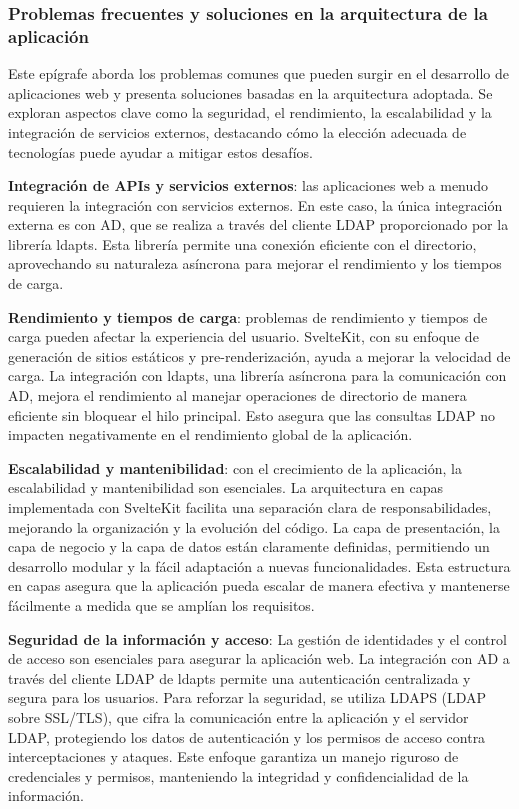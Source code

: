 \subsubsection{Problemas frecuentes y soluciones en la arquitectura de la aplicación}

Este epígrafe aborda los problemas comunes que pueden surgir en el desarrollo de aplicaciones web y presenta soluciones basadas en la arquitectura adoptada. Se exploran aspectos clave como la seguridad, el rendimiento, la escalabilidad y la integración de servicios externos, destacando cómo la elección adecuada de tecnologías puede ayudar a mitigar estos desafíos.

\textbf{Integración de APIs y servicios externos}: las aplicaciones web a menudo requieren la integración con servicios externos. En este caso, la única integración externa es con AD, que se realiza a través del cliente LDAP proporcionado por la librería ldapts. Esta librería permite una conexión eficiente con el directorio, aprovechando su naturaleza asíncrona para mejorar el rendimiento y los tiempos de carga.

\textbf{Rendimiento y tiempos de carga}: problemas de rendimiento y tiempos de carga pueden afectar la experiencia del usuario. SvelteKit, con su enfoque de generación de sitios estáticos y pre-renderización, ayuda a mejorar la velocidad de carga. La integración con ldapts, una librería asíncrona para la comunicación con AD, mejora el rendimiento al manejar operaciones de directorio de manera eficiente sin bloquear el hilo principal. Esto asegura que las consultas LDAP no impacten negativamente en el rendimiento global de la aplicación.

\textbf{Escalabilidad y mantenibilidad}: con el crecimiento de la aplicación, la escalabilidad y mantenibilidad son esenciales. La arquitectura en capas implementada con SvelteKit facilita una separación clara de responsabilidades, mejorando la organización y la evolución del código. La capa de presentación, la capa de negocio y la capa de datos están claramente definidas, permitiendo un desarrollo modular y la fácil adaptación a nuevas funcionalidades. Esta estructura en capas asegura que la aplicación pueda escalar de manera efectiva y mantenerse fácilmente a medida que se amplían los requisitos.

\textbf{Seguridad de la información y acceso}: La gestión de identidades y el control de acceso son esenciales para asegurar la aplicación web. La integración con AD a través del cliente LDAP de ldapts permite una autenticación centralizada y segura para los usuarios. Para reforzar la seguridad, se utiliza LDAPS (LDAP sobre SSL/TLS), que cifra la comunicación entre la aplicación y el servidor LDAP, protegiendo los datos de autenticación y los permisos de acceso contra interceptaciones y ataques. Este enfoque garantiza un manejo riguroso de credenciales y permisos, manteniendo la integridad y confidencialidad de la información.